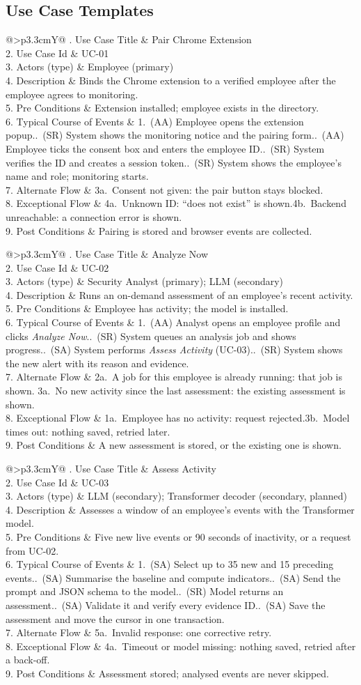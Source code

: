 \documentclass[openany]{tietreport}
\makeatletter
\newcommand{\uctable}[9]{%
\begin{table}[H]
\centering
\small
\caption{Use case template #1: #2.}
\begin{tabularx}{\linewidth}{@{}>{\bfseries}p{3.3cm}Y@{}}
\toprule
1. Use Case Title & #2 \\
2. Use Case Id & #1 \\
3. Actors (type) & #3 \\
4. Description & #4 \\
5. Pre Conditions & #5 \\
6. Typical Course of Events & #6 \\
7. Alternate Flow & #7 \\
8. Exceptional Flow & #8 \\
9. Post Conditions & #9 \\
\bottomrule
\end{tabularx}
\end{table}}
\makeatother
\begin{document}
\subsection{Use Case Templates}

\uctable{UC-01}{Pair Chrome Extension}{Employee (primary)}
{Binds the Chrome extension to a verified employee after the employee agrees to monitoring.}
{Extension installed; employee exists in the directory.}
{1.~(AA) Employee opens the extension popup.\newline
2.~(SR) System shows the monitoring notice and the pairing form.\newline
3.~(AA) Employee ticks the consent box and enters the employee ID.\newline
4.~(SR) System verifies the ID and creates a session token.\newline
5.~(SR) System shows the employee's name and role; monitoring starts.}
{3a.~Consent not given: the pair button stays blocked.}
{4a.~Unknown ID: ``does not exist'' is shown.\newline 4b.~Backend unreachable: a connection error is shown.}
{Pairing is stored and browser events are collected.}

\uctable{UC-02}{Analyze Now}{Security Analyst (primary); LLM (secondary)}
{Runs an on-demand assessment of an employee's recent activity.}
{Employee has activity; the model is installed.}
{1.~(AA) Analyst opens an employee profile and clicks \emph{Analyze Now}.\newline
2.~(SR) System queues an analysis job and shows progress.\newline
3.~(SA) System performs \emph{Assess Activity} (UC-03).\newline
4.~(SR) System shows the new alert with its reason and evidence.}
{2a.~A job for this employee is already running: that job is shown.\newline
3a.~No new activity since the last assessment: the existing assessment is shown.}
{1a.~Employee has no activity: request rejected.\newline 3b.~Model times out: nothing saved, retried later.}
{A new assessment is stored, or the existing one is shown.}

\uctable{UC-03}{Assess Activity}{LLM (secondary); Transformer decoder (secondary, planned)}
{Assesses a window of an employee's events with the Transformer model.}
{Five new live events or 90 seconds of inactivity, or a request from UC-02.}
{1.~(SA) Select up to 35 new and 15 preceding events.\newline
2.~(SA) Summarise the baseline and compute indicators.\newline
3.~(SA) Send the prompt and JSON schema to the model.\newline
4.~(SR) Model returns an assessment.\newline
5.~(SA) Validate it and verify every evidence ID.\newline
6.~(SA) Save the assessment and move the cursor in one transaction.}
{5a.~Invalid response: one corrective retry.}
{4a.~Timeout or model missing: nothing saved, retried after a back-off.}
{Assessment stored; analysed events are never skipped.}
\end{document}
